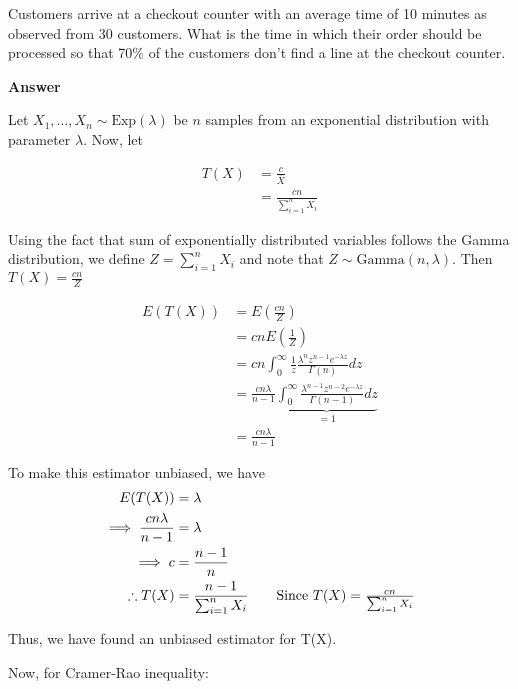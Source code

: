 \documentclass[12pt, oneside]{article}
\begin{document}
\begin{enumerate}
{  Customers arrive at a checkout counter with an average time of 10 minutes as observed
  from 30 customers.
  What is the time in which their order should be processed so that 70\% of the customers
  don't find a line at the checkout counter.
  
  \textbf{Answer}

  Let \(X_1, \ldots, X_n \sim \text{Exp}(\lambda)\) be \(n\) samples from an exponential
  distribution with parameter \(\lambda\). Now, let

  \begin{align*}
    T(X) &= \frac{c}{\overline{X}} \\
         &= \frac{cn}{\sum_{i=1}^{n} X_i}
  \end{align*}

  Using the fact that sum of exponentially distributed variables follows the Gamma distribution,
  we define \(Z = \sum_{i = 1}^{n} X_i\) and note that \(Z \sim \text{Gamma}(n, \lambda)\).
  Then \(T(X) = \frac{cn}{Z}\)

  \begin{align*}
    E(T(X)) &= E\left(\frac{cn}{Z}\right) \\
            &= cn E\left(\frac{1}{Z}\right) \\
            &= cn \int_{0}^{\infty} \frac{1}{z} \frac{\lambda^n z^{n-1} e^{-\lambda z}}{\Gamma(n)} dz \tag*{(\(\because Z \sim Gamma(n, \lambda)\))} \\
            &= \frac{cn\lambda}{n-1} \underbrace{\int_{0}^{\infty} \frac{\lambda^{n-1} z^{n-2} e^{-\lambda z}}{\Gamma(n-1)} dz}_{ = 1} \tag*{(\(\because \Gamma(n) = (n-1) \Gamma(n-1)\))} \\
            &= \frac{cn\lambda}{n-1}
  \end{align*}

  To make this estimator unbiased, we have
  \begin{align*}
    E(T(X)) &= \lambda \\
    \implies \frac{cn\lambda}{n-1} &= \lambda \\
    \implies c &= \frac{n-1}{n} \\
    \therefore T(X) &= \frac{n - 1}{\sum_{i=1}^{n} X_i} \tag*{Since \(T(X) = \frac{cn}{\sum_{i=1}^{n} X_i}\)}
  \end{align*}

  Thus, we have found an unbiased estimator for T(X).

  Now, for Cramer-Rao inequality:

}
\end{enumerate}
\end{document}
